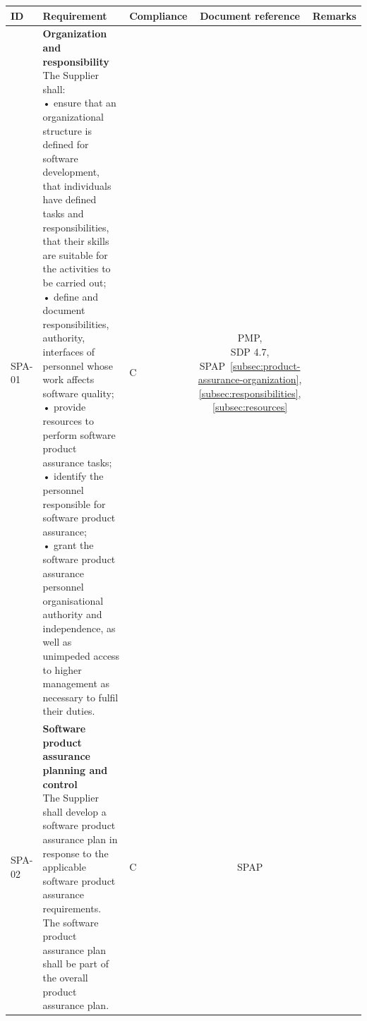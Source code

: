 {
    \renewcommand{\arraystretch}{1.4} %
    \tiny
    \selectfont
    
    \begin{xltabular}{\textwidth}{|l|L|l|S|S|}
        \hline
        ID & Requirement & Compliance & Document reference & Remarks \\ \hline\hline
        \endhead

        SPA-01 & 
        {\textbf{Organization and responsibility} \newline
        The Supplier shall: \newline
        • ensure that an organizational structure is defined for software development, that individuals have defined tasks and responsibilities, that their skills are suitable for the activities to be carried out; \newline
        • define and document responsibilities, authority, interfaces of personnel whose work affects software quality; \newline
        • provide resources to perform software product assurance tasks; \newline
        • identify the personnel responsible for software product assurance; \newline
        • grant the software product assurance personnel organisational authority and independence, as well as unimpeded access to higher management as necessary to fulfil their duties.} &
        C &
        {PMP, \newline SDP 4.7, \newline SPAP~\ref{subsec:product-assurance-organization}, \ref{subsec:responsibilities}, \ref{subsec:resources}} & 
        \\ \hline

        SPA-02 &
        {\textbf{Software product assurance planning and control} \newline
        The Supplier shall develop a software product assurance plan in response to the applicable software product assurance requirements. The software product assurance plan shall be part of the overall product assurance plan.} &
        C &
        SPAP &
        \\ \hline


\end{xltabular}}

